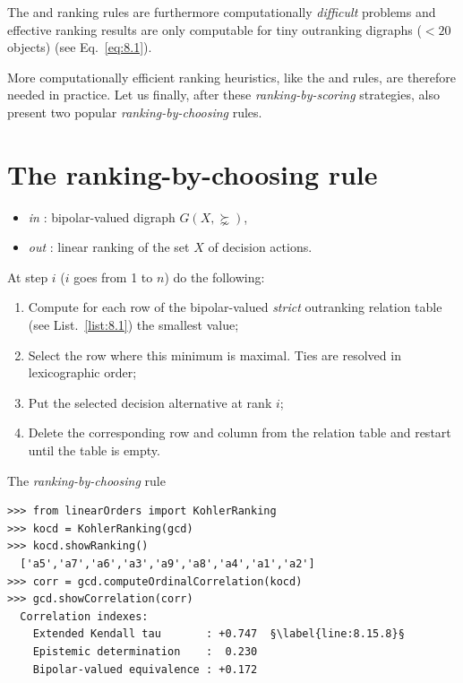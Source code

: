 The \Kemeny and \Slater ranking rules are furthermore computationally \emph{difficult} problems and effective ranking results are only computable for tiny outranking digraphs ($< 20$ objects) (see Eq.~\vref{eq:8.1}). 

More computationally efficient ranking heuristics, like the \Copeland and \NetFlows rules, are therefore needed in practice. Let us finally, after these \emph{ranking-by-scoring} strategies, also present two popular \emph{ranking-by-choosing} rules.

\section{The \Kohler ranking-by-choosing rule}
\label{sec:8.6}

\begin{algorithm}[H]
  {\normalsize
\begin{itemize}
 \item [] \emph{in} : bipolar-valued digraph $G(X,\succnsim)$,
 \item [] \emph{out} : linear ranking of the set $X$ of decision actions.
\end{itemize}
At step $i$ ($i$ goes from 1 to $n$) do the following:
\begin{enumerate}[leftmargin=0.5cm,rightmargin=0.5cm,topsep=1pt]
\item Compute for each row of the bipolar-valued \emph{strict} outranking relation table (see List.~\vref{list:8.1}) the smallest value;
\item Select the row where this minimum is maximal. Ties are resolved in lexicographic order;
\item Put the selected decision alternative at rank $i$;
\item Delete the corresponding row and column from the relation table and restart until the table is empty.
\end{enumerate}
}
\caption{The \Kohler \emph{ranking-by-choosing} rule \citep{KOH-1978}}
\label{alg:8.3}
\end{algorithm}

\begin{lstlisting}[caption={Computing a \Kohler ranking},label=list:8.15]   
>>> from linearOrders import KohlerRanking
>>> kocd = KohlerRanking(gcd)
>>> kocd.showRanking()
  ['a5','a7','a6','a3','a9','a8','a4','a1','a2']
>>> corr = gcd.computeOrdinalCorrelation(kocd)
>>> gcd.showCorrelation(corr)
  Correlation indexes:
    Extended Kendall tau       : +0.747  §\label{line:8.15.8}§
    Epistemic determination    :  0.230
    Bipolar-valued equivalence : +0.172
\end{lstlisting}

